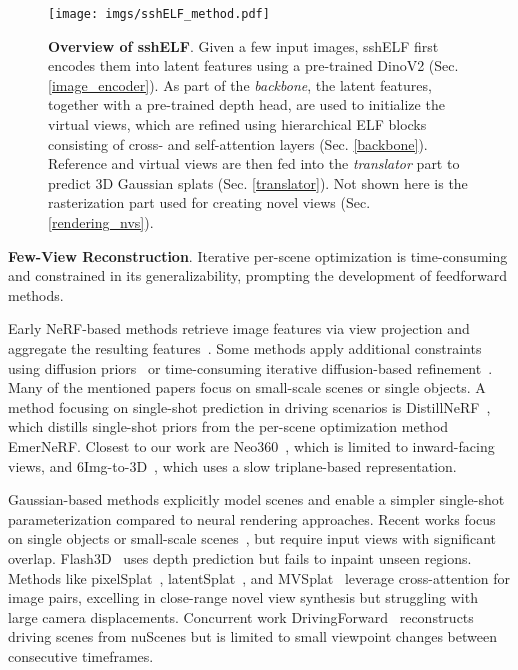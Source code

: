 \begin{figure*}[t!]
    \centering
    \texttt{[image: imgs/sshELF\_method.pdf]}
    \caption{\textbf{Overview of sshELF}. Given a few input images, sshELF first encodes them into latent features using a pre-trained DinoV2 (Sec.\ref{image_encoder}). As part of the \textit{backbone}, the latent features, together with a pre-trained depth head, are used to initialize the virtual views, which are refined using hierarchical ELF blocks consisting of cross- and self-attention layers (Sec. \ref{backbone}). Reference and virtual views are then fed into the \textit{translator} part to predict 3D Gaussian splats (Sec. \ref{translator}). Not shown here is the rasterization part used for creating novel views (Sec. \ref{rendering_nvs}).}
    \label{fig:sshELF_model}
\end{figure*}

\noindent \textbf{Few-View Reconstruction}. Iterative per-scene optimization is time-consuming and constrained in its generalizability, prompting the development of feedforward methods. 

Early NeRF-based methods retrieve image features via view projection and aggregate the resulting features~\cite{yu2020pixelnerf, wang2021ibrnet, mvsnerf}. Some methods apply additional constraints using diffusion priors~\cite{ReconFusion_Wu_2024_CVPR} or time-consuming iterative diffusion-based refinement~\cite{szymanowicz2023viewset_diffusion, RenderDiffusion_Anciukevicius_2023_CVPR}. Many of the mentioned papers focus on small-scale scenes or single objects. A method focusing on single-shot prediction in driving scenarios is DistillNeRF~\cite{wang2024distillnerf}, which distills single-shot priors from the per-scene optimization method EmerNeRF. Closest to our work are Neo360~\cite{irshad2023neo360}, which is limited to inward-facing views, and 6Img-to-3D~\cite{gieruc20246imgto3d}, which uses a slow triplane-based representation.

Gaussian-based methods explicitly model scenes and enable a simpler single-shot parameterization compared to neural rendering approaches. Recent works focus on single objects or small-scale scenes~\cite{xu2024grm, TriplaneGaussian_Zou_2024_CVPR, yang2024gaussianobject, szymanowicz24splatter}, but require input views with significant overlap. Flash3D~\cite{szymanowicz2024flash3d} uses depth prediction but fails to inpaint unseen regions. Methods like pixelSplat~\cite{pixelsplat_Charatan_2024_CVPR}, latentSplat~\cite{wewer2024latentsplat}, and MVSplat~\cite{MVSplat} leverage cross-attention for image pairs, excelling in close-range novel view synthesis but struggling with large camera displacements. Concurrent work DrivingForward~\cite{tian2024drivingforwardfeedforward3dgaussian} reconstructs driving scenes from nuScenes but is limited to small viewpoint changes between consecutive timeframes.


